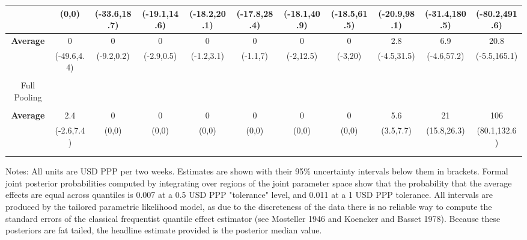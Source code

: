 \documentclass[english,12pt]{article}\usepackage{lmodern}
\numberwithin{equation}{section}
\begin{document}
\begin{landscape}
\begin{table}[!htbp]
\begin{tabular}{@{\extracolsep{5pt}} ccccccccccc}
& (0,0) & (-33.6,18.7) & (-19.1,14.6) & (-18.2,20.1) & (-17.8,28.4) & (-18.1,40.9) & (-18.5,61.5) & (-20.9,98.1) & (-31.4,180.5) & (-80.2,491.6) \\
\hline
\textbf{Average} & 0 & 0 & 0 & 0 & 0 & 0 & 0 & 2.8 & 6.9 & 20.8 \\
 & (-49.6,4.4) & (-9.2,0.2) & (-2.9,0.5) & (-1.2,3.1) & (-1.1,7) & (-2,12.5) & (-3,20) & (-4.5,31.5) & (-4.6,57.2) & (-5.5,165.1) \\
 \hline \\[-1.8ex]
Full Pooling &&&&&&&&&& \\
\hline \\[-1.8ex]
\textbf{Average} & 2.4 & 0 & 0 & 0 & 0 & 0 & 0 & 5.6 & 21 & 106 \\
 & (-2.6,7.4) & (0,0) & (0,0) & (0,0) & (0,0) & (0,0) & (0,0) & (3.5,7.7) & (15.8,26.3) & (80.1,132.6) \\
\hline \\[-1.8ex]

\hline \\[-1.8ex]

\end{tabular}
\raggedright{\scriptsize Notes: All units are USD PPP per two weeks. Estimates are shown with their 95\% uncertainty intervals below them in brackets. Formal joint posterior probabilities computed by integrating over regions of the joint parameter space show that the probability that the average effects are equal across quantiles is 0.007 at a 0.5 USD PPP "tolerance" level, and 0.011 at a 1 USD PPP tolerance. All intervals are produced by the tailored parametric likelihood model, as due to the discreteness of the data there is no reliable way to compute the standard errors of the classical frequentist quantile effect estimator (see Mosteller 1946 and Koencker and Basset 1978). Because these posteriors are fat tailed, the headline estimate provided is the posterior median value. }

\end{table}

\end{landscape}
\end{document}
